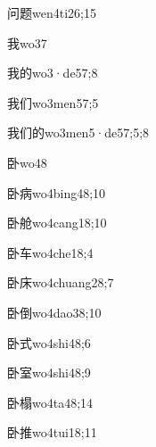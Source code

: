 \begin{verbete}{问题}{wen4ti2}{6;15}
\end{verbete}
\begin{verbete}{我}{wo3}{7}
\end{verbete}
\begin{verbete}{我的}{wo3·de5}{7;8}
\end{verbete}
\begin{verbete}{我们}{wo3men5}{7;5}
\end{verbete}
\begin{verbete}{我们的}{wo3men5·de5}{7;5;8}
\end{verbete}
\begin{verbete}{卧}{wo4}{8}
\end{verbete}
\begin{verbete}{卧病}{wo4bing4}{8;10}
\end{verbete}
\begin{verbete}{卧舱}{wo4cang1}{8;10}
\end{verbete}
\begin{verbete}{卧车}{wo4che1}{8;4}
\end{verbete}
\begin{verbete}{卧床}{wo4chuang2}{8;7}
\end{verbete}
\begin{verbete}{卧倒}{wo4dao3}{8;10}
\end{verbete}
\begin{verbete}{卧式}{wo4shi4}{8;6}
\end{verbete}
\begin{verbete}{卧室}{wo4shi4}{8;9}
\end{verbete}
\begin{verbete}{卧榻}{wo4ta4}{8;14}
\end{verbete}
\begin{verbete}{卧推}{wo4tui1}{8;11}
\end{verbete}
